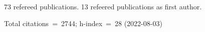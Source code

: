 73 refereed publications. 13 refeered publications as first author.

Total citations~=~2744; h-index~=~28 (2022-08-03)